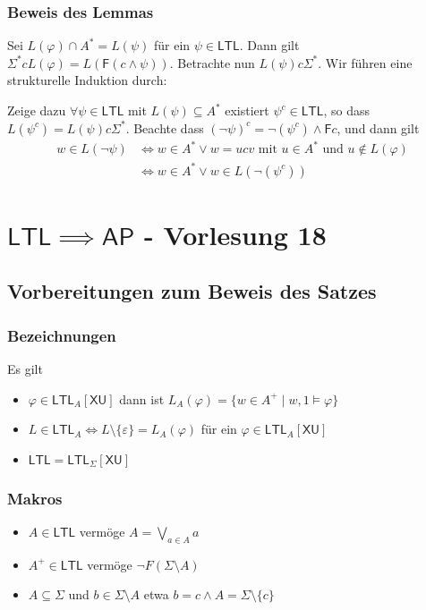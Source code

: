 \documentclass[12pt, german]{article}
\newcommand{\sigstern}{\Sigma^\ast}
\newcommand{\aast}{A^{\ast}}
\newcommand{\ap}{\mathsf{AP}}
\newcommand{\ltl}{\mathsf{LTL}}
\newcommand{\sX}{\mathsf{X}}
\newcommand{\sF}{\mathsf{F}}
\newcommand{\sU}{\mathsf{U}}
\begin{document}
\subsubsection{Beweis des Lemmas}
	Sei $L(\varphi) \cap \aast = L(\psi)$ für ein $\psi \in \ltl$. Dann gilt $\sigstern c L(\varphi) = L(\sF(c \land \psi))$. 
	Betrachte nun $L(\psi) c \sigstern$. Wir führen eine strukturelle Induktion durch: 
	\newline
	
	Zeige dazu $\forall \psi \in \ltl$ mit $L(\psi) \subseteq \aast$ existiert $\psi^c \in \ltl$, so dass $L(\psi^c) = L(\psi) c \sigstern$. Beachte dass $(\neg \psi )^c = \neg (\psi^c) \land \sF c$, und dann gilt 
	\begin{align*}
		w \in L(\neg \psi) &\iff w \in \aast \lor w = ucv \text{ mit } u \in \aast \text{ und } u \not \in L(\varphi) \\
		&\iff w \in \aast \lor w \in L(\neg(\psi^c))
	\end{align*}

\section{$\ltl \implies \ap$ - Vorlesung 18}
\subsection{Vorbereitungen zum Beweis des Satzes}
\subsubsection{Bezeichnungen}
	Es gilt 
	\begin{itemize}
		\item $\varphi \in \ltl_A[\sX\sU]$ dann ist $L_A(\varphi) = \{w \in A^+ \mid w,1 \models \varphi\}$
		\item $L \in \ltl_A \iff L \setminus \{\varepsilon\} = L_A(\varphi)$ für ein $\varphi \in \ltl_A[\sX\sU]$
		\item $\ltl = \ltl_\Sigma[\sX\sU]$
	\end{itemize}

\subsubsection{Makros}
	\begin{itemize}
		\item $A \in \ltl$ vermöge $A = \bigvee_{a \in A} a$
		\item $A^+ \in \ltl$ vermöge $\neg F(\Sigma \setminus A)$ 
		\item $A \subseteq \Sigma$ und $b \in \Sigma \setminus A$ etwa $b = c \land A = \Sigma \setminus \{c\}$
	\end{itemize}
\end{document}
